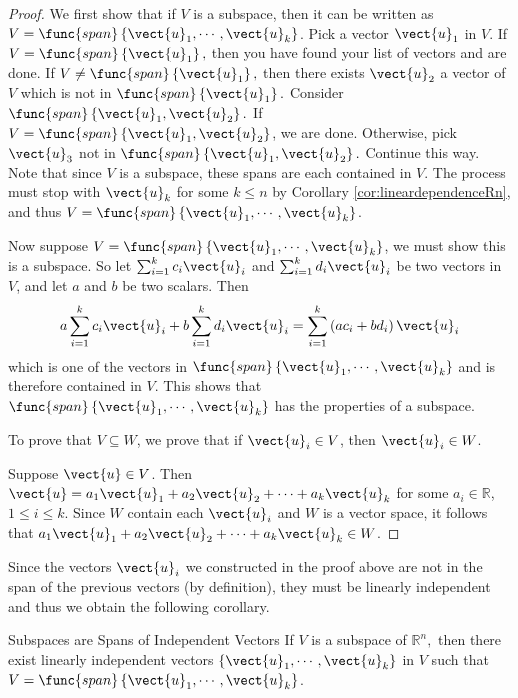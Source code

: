 \begin{proof}
We first show that if $V$ is a subspace, then it can be written as $V= \func{span}\left\{ \vect{u}_{1},\cdots ,\vect{u}_{k}\right\}$. Pick a vector $\vect{u}_{1}$ in $V$. If $V=
\func{span}\left\{ \vect{u}_{1}\right\} ,$ then you have found your
list of vectors and are done. If $V\neq \func{span}\left\{ \vect{u}_{1}\right\} ,$ then
there exists $\vect{u}_{2}$ a vector of $V$ which is not in $
\func{span}\left\{ \vect{u}_{1}\right\} .$ Consider $\func{span}\left\{ 
\vect{u}_{1},\vect{u}_{2}\right\}.$ 
If $V=\func{span}\left\{ \vect{u}_{1},\vect{u}_{2}\right\}$, we are
done. Otherwise, pick $\vect{u}_{3}$ not in $\func{span}\left\{ \vect{u}_{1},\vect{u}_{2}\right\} .$ Continue this way.
Note that since $V $ is a subspace, these spans are each contained in
$V$.  The process must stop with $\vect{u}_{k}$ for some $k\leq n$
by Corollary \ref{cor:lineardependenceRn}, and thus $V=\func{span}\left\{ \vect{u}_{1},\cdots ,
\vect{u}_{k}\right\}$.

Now suppose $V=\func{span}\left\{ \vect{u}_{1},\cdots ,
\vect{u}_{k}\right\}$, we must show this is a subspace. So let $\sum_{i=1}^{k}c_{i}\vect{u}_{i}$ and $
\sum_{i=1}^{k}d_{i}\vect{u}_{i}$ be two vectors in $V$, and let $a$
and $b$ be two scalars. Then 
\begin{equation*}
a \sum_{i=1}^{k}c_{i}\vect{u}_{i}+ b \sum_{i=1}^{k}d_{i}\vect{u}_{i}=
 \sum_{i=1}^{k}\left( a c_{i}+b  d_{i}\right) \vect{u}_{i}
\end{equation*}
which is one of the vectors in $\func{span}\left\{ \vect{u}_{1},\cdots ,
\vect{u}_{k}\right\}$ and is therefore contained in $V$. This shows that $\func{span}\left\{ \vect{u}_{1},\cdots ,\vect{u}_{k}\right\} $ has the properties of a subspace. 

To prove that $V \subseteq W$, we prove that if
$\vect{u}_i\in V$, then $\vect{u}_i \in W$.

Suppose $\vect{u}\in V$. 
Then $\vect{u}=a_1\vect{u}_1 + a_2\vect{u}_2 + \cdots + a_k\vect{u}_k$
for some $a_i\in\mathbb{R}$, $1\leq i\leq k$.
Since $W$ contain each $\vect{u}_i$ and $W$ is a vector space, it follows that $ a_1\vect{u}_1 + a_2\vect{u}_2 + \cdots + a_k\vect{u}_k \in W$. 
\end{proof}

Since the vectors $\vect{u}_i$ we constructed in the proof above are not in the span
of the previous vectors (by definition), they must be linearly independent and thus we
obtain the following corollary.

\begin{corollary}{Subspaces are Spans of Independent Vectors}\label{cor:subspacesarespansindependentvectors}
If $V$ is a subspace of $\mathbb{R}^{n},$ then there exist linearly independent 
vectors $\left\{ \vect{u}_{1},\cdots ,\vect{u}_{k}\right\}$ in $V$ such
that $V=\func{span}\left\{ \vect{u}_{1},\cdots ,\vect{u}_{k}\right\} $.
\end{corollary}


